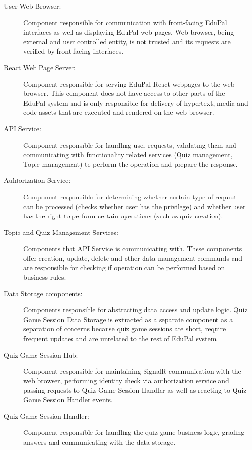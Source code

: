 \begin{description}
  \item[User Web Browser:] Component responsible for communication with front-facing EduPal interfaces as well as displaying EduPal web pages. Web browser, being external and user controlled entity, is not trusted and its requests are verified by front-facing interfaces.
  \item[React Web Page Server:] Component responsible for serving EduPal React webpages to the web browser. This component does not have access to other parts of the EduPal system and is only responsible for delivery of hypertext, media and code assets that are executed and rendered on the web browser.
  \item[API Service:] Component responsible for handling user requests, validating them and communicating with functionality related services (Quiz management, Topic management) to perform the operation and prepare the response.
  \item[Auhtorization Service:] Component responsible for determining whether certain type of request can be processed (checks whether user has the privilege) and whether user has the right to perform certain operations (such as quiz creation).
  \item[Topic and Quiz Management Services:] Components that API Service is communicating with. These components offer creation, update, delete and other data management commands and are responsible for checking if operation can be performed based on business rules.
  \item[Data Storage components:] Components responsible for abstracting data access and update logic. Quiz Game Session Data Storage is extracted as a separate component as a separation of concerns because quiz game sessions are short, require frequent updates and are unrelated to the rest of EduPal system.
  \item[Quiz Game Session Hub:] Component responsible for maintaining SignalR communication with the web browser, performing identity check via authorization service and passing requests to Quiz Game Session Handler as well as reacting to Quiz Game Session Handler events.
  \item[Quiz Game Session Handler:] Component responsible for handling the quiz game business logic, grading answers and communicating with the data storage.

\end{description}
